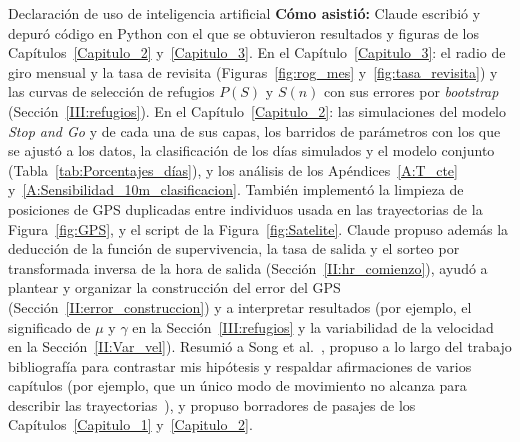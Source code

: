 \documentclass[12pt,screen,twoside,pagebackref]{ibtesis}
\begin{document}
\begin{postliminary}
\begin{seccion}{Declaración de uso de inteligencia artificial}
\textbf{Cómo asistió:} Claude escribió y depuró código en Python con el que se obtuvieron resultados y figuras de los 
Capítulos~\ref{Capitulo_2} y~\ref{Capitulo_3}. En el Capítulo~\ref{Capitulo_3}: el radio de giro mensual y la tasa de revisita (Figuras~\ref{fig:rog_mes} 
y~\ref{fig:tasa_revisita}) y las curvas de selección de refugios $P(S)$ y $S(n)$ con sus errores por \textit{bootstrap} (Sección~\ref{III:refugios}). 
En el Capítulo~\ref{Capitulo_2}: las simulaciones del modelo \textit{Stop and Go} y de cada una de sus capas, los barridos de parámetros con los que se 
ajustó a los datos, la clasificación de los días simulados y el modelo conjunto (Tabla~\ref{tab:Porcentajes_días}), y los análisis de los 
Apéndices~\ref{A:T_cte} y~\ref{A:Sensibilidad_10m_clasificacion}. También implementó la limpieza de posiciones de GPS duplicadas entre individuos usada 
en las trayectorias de la Figura~\ref{fig:GPS}, y el script de la Figura~\ref{fig:Satelite}. Claude propuso además la deducción de la función de supervivencia, 
la tasa de salida y el sorteo por transformada inversa de la hora de salida (Sección~\ref{II:hr_comienzo}), ayudó a plantear y organizar la construcción 
del error del GPS (Sección~\ref{II:error_construccion}) y a interpretar resultados (por ejemplo, el significado de $\mu$ y $\gamma$ en la Sección~\ref{III:refugios} 
y la variabilidad de la velocidad en la Sección~\ref{II:Var_vel}). Resumió a Song et al.~\cite{song2010modeling}, propuso a lo largo del trabajo bibliografía 
para contrastar mis hipótesis y respaldar afirmaciones de varios capítulos (por ejemplo, que un único modo de movimiento no alcanza para describir las 
trayectorias~\cite{morales2004extracting,fryxell2008multiple}), y propuso borradores de pasajes de los Capítulos~\ref{Capitulo_1} y~\ref{Capitulo_2}.


\end{seccion}
\end{postliminary}
\end{document}

